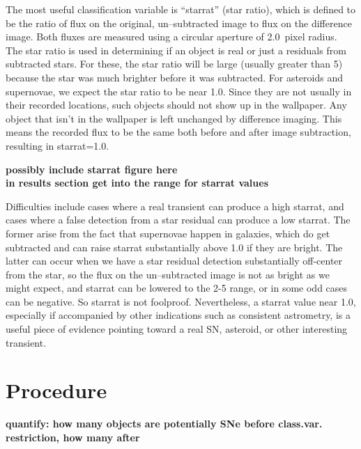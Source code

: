 \documentclass[aps,prb,twocolumn,superscriptaddress]{revtex4-1}
\begin{document}
%
The most useful classification variable is ``starrat'' (star ratio), 
which is defined to be the ratio of flux on the original, un--subtracted 
image to flux on the difference image.  Both fluxes are measured using a 
circular aperture of 2.0~pixel radius.  The star ratio is used in 
determining if an object is real or just a residuals from subtracted stars.  
For these, the star ratio will be large (usually greater than 5) because 
the star was much brighter before it was subtracted.  For asteroids and 
supernovae, we expect the star ratio to be near 1.0.  Since they are not 
usually in their recorded locations, such objects should not show up in the wallpaper.  
Any object that isn't in the wallpaper is left unchanged by difference imaging.  
This means the recorded flux to be the same both before and after image subtraction, 
resulting in starrat=1.0.

{\bf possibly include starrat figure here}\\
{\bf in results section get into the range for starrat values}

Difficulties include cases where a real transient can produce a high 
starrat, and cases where a false detection from a star residual can 
produce a low starrat. The former arise from the fact that supernovae 
happen in galaxies, which do get subtracted and can raise starrat 
substantially above 1.0 if they are bright. The latter can occur when 
we have a star residual detection substantially off-center from the 
star, so the flux on the un--subtracted image is not as bright as we might 
expect, and starrat can be lowered to the 2-5 range, or in some odd 
cases can be negative. So starrat is not foolproof. Nevertheless, a 
starrat value near 1.0, especially if accompanied by other indications 
such as consistent astrometry, is a useful piece of evidence pointing 
toward a real SN, asteroid, or other interesting transient.






\section{Procedure}
{\bf quantify: how many objects are potentially SNe before class.var. restriction, how many after\\
}
\end{document}
